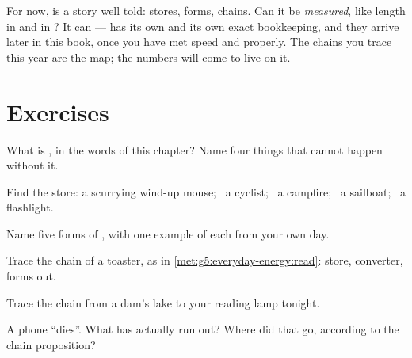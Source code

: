 \begin{remark}\label{rem:g5:everyday-energy:promise}
For now,  is a story well told: stores, forms, chains. Can
it be \emph{measured}, like length in  and  in ? It
can ---  has its own  and its own exact bookkeeping, and
they arrive later in this book, once you have met speed and 
properly. The chains you trace this year are the map; the numbers
will come to live on it.
\end{remark}

\section{Exercises}

\begin{exercise}[$\star$]\label{exo:g5:everyday-energy:1}
What is , in the words of this chapter? Name four things that
cannot happen without it.
\end{exercise}

\begin{exercise}[$\star$]\label{exo:g5:everyday-energy:2}
Find the store: a scurrying wind-up mouse; \ a cyclist; \ a
campfire; \ a sailboat; \ a flashlight.
\end{exercise}

\begin{exercise}[$\star$]\label{exo:g5:everyday-energy:3}
Name five forms of , with one example of
each from your own day.
\end{exercise}

\begin{exercise}[$\star$]\label{exo:g5:everyday-energy:4}
Trace the  chain of a toaster, as in
\cref{met:g5:everyday-energy:read}: store, converter, forms out.
\end{exercise}

\begin{exercise}[$\star$]\label{exo:g5:everyday-energy:5}
Trace the chain from a dam's lake to your reading lamp tonight.
\end{exercise}

\begin{exercise}[$\star$]\label{exo:g5:everyday-energy:6}
A phone ``dies''. What has actually run out? Where did that 
go, according to the chain proposition?
\end{exercise}

